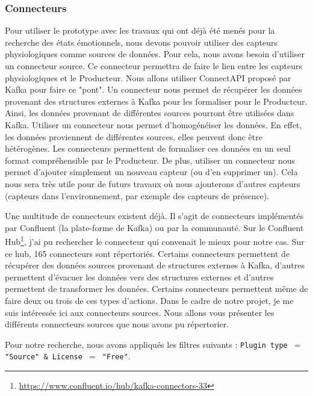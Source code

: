 \documentclass[11pt]{article}
\begin{document}
		\subsubsection{Connecteurs}\label{sec:connecteurs}
			Pour utiliser le prototype avec les travaux qui ont déjà été menés pour la recherche des états émotionnels, nous devons pouvoir utiliser des capteurs physiologiques comme sources de données.
			Pour cela, nous avons besoin d'utiliser un connecteur source.
			Ce connecteur permettra de faire le lien entre les capteurs physiologiques et le Producteur.
			Nous allons utiliser ConnectAPI proposé par Kafka pour faire ce "pont".
			Un connecteur nous permet de récupérer les données provenant des structures externes à Kafka pour les formaliser pour le Producteur.
			Ainsi, les données provenant de différentes sources pourront être utilisées dans Kafka.
			Utiliser un connecteur nous permet d'homogénéiser les données.
			En effet, les données proviennent de différentes sources, elles peuvent donc être hétérogènes. 
			Les connecteurs permettent de formaliser ces données en un seul format compréhensible par le Producteur.
			De plus, utiliser un connecteur nous permet d'ajouter simplement un nouveau capteur (ou d'en supprimer un).
			Cela nous sera très utile pour de futurs travaux où nous ajouterons d'autres capteurs (capteurs dans l'environnement, par exemple des capteurs de présence).\par
			Une multitude de connecteurs existent déjà. 
			Il s'agit de connecteurs implémentés par Confluent (la plate-forme de Kafka) ou par la communauté.
			Sur le Confluent Hub\footnote{\href{https://www.confluent.io/hub/kafka-connectors-33}{https://www.confluent.io/hub/kafka-connectors-33}}, j'ai pu rechercher le connecteur qui convenait le mieux pour notre cas.
			Sur ce hub, 165 connecteurs sont répertoriés.
			Certains connecteurs permettent de récupérer des données sources provenant de structures externes à Kafka, d'autres permettent d'évacuer les données vers des structures externes et d'autres permettent de transformer les données.
			Certains connecteurs permettent même de faire deux ou trois de ces types d'actions. 
			Dans le cadre de notre projet, je me suis intéressée ici aux connecteurs sources.
			Nous allons vous présenter les différents connecteurs sources que nous avons pu répertorier.\par
			Pour notre recherche, nous avons appliqués les filtres suivants : \newline
			\texttt{Plugin type $=$ "Source" \& License $=$ "Free"}.\newline
\end{document}
